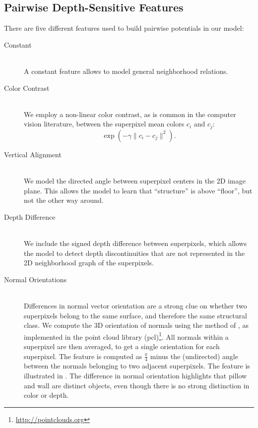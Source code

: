 \documentclass[a4paper, 10pt, conference]{ieeeconf}      %
\begin{document}
\subsection{Pairwise Depth-Sensitive Features}
There are five different features used to build pairwise potentials in our model:
\begin{description}
    \item[Constant] \hfill \\
        A constant feature allows to model general neighborhood relations.

    \item[Color Contrast] \hfill \\
        We employ a non-linear color contrast, as is common in the computer
        vision literature, between the superpixel mean colors $c_i$ and $c_j$:
        \[\exp\left(-\gamma \lVert c_i - c_j \rVert^2\right).\]

    \item[Vertical Alignment] \hfill \\
        We model the directed angle between superpixel centers in the 2D image
        plane.  This allows the  model to learn that ``structure'' is above
        ``floor'', but not the other way around.

    \item[Depth Difference] \hfill \\
        We include the signed depth difference between superpixels, which
        allows the model to detect depth discontinuities that are not
        represented in the 2D neighborhood graph of the superpixels.

    \item[Normal Orientations] \hfill \\
        Differences in normal vector orientation are a strong clue on
        whether two superpixels belong to the same surface, and therefore the
        same structural class.
        We compute the 3D orientation of normals using the method of \citet{holz_2011_robocup},
        as implemented in the point cloud library (pcl)\footnote{\url{http://pointclouds.org}}.
        All normals within a superpixel are then averaged, to get a single orientation for each superpixel.
        The feature is computed as $\frac{\pi}{4}$ minus the (undirected) angle between the normals belonging
        to two adjacent superpixels.  
        The feature is illustrated in . The difference
        in normal orientation highlights that pillow and wall are distinct
        objects, even though there is no strong distinction in color or depth.
\end{description}
\end{document}
